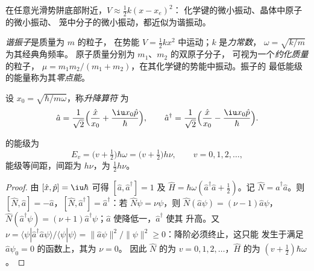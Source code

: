 在任意光滑势阱底部附近，$V \approx \frac12 k(x - x_e)^2$：
化学键的微小振动、晶体中原子的微小振动、
笼中分子的微小振动，都近似为谐振动。

\begin{definition}\label{def:b3:quantum-model-systems:oscillator}
\emph{谐振子}是质量为 $m$ 的粒子，
在势能 $V = \frac12 kx^2$ 中运动；$k$ 是\emph{力常数}，
$\omega = \sqrt{k/m}$ 为其经典角频率。
原子质量分别为 $m_1$、$m_2$ 的双原子分子，
可视为一个\emph{约化质量}的粒子，
$\mu = m_1m_2/(m_1 + m_2)$，在其化学键的势能中振动。振子的
最低能级的能量称为其\emph{零点能}。
\end{definition}

\begin{definition}[升降算符]\label{def:b3:quantum-model-systems:ladder}
设 $x_0 = \sqrt{\hbar/m\omega}$，称\emph{升降算符}
为
\[
\hat a = \frac{1}{\sqrt2}\Big(\frac{\hat x}{x_0} + \frac{\iu x_0\hat p}{\hbar}\Big),
\qquad \hat a^\dagger = \frac{1}{\sqrt2}\Big(\frac{\hat x}{x_0} -
\frac{\iu x_0\hat p}{\hbar}\Big).
\]
\end{definition}

\begin{theorem}[谐振子的能级]\label{thm:b3:quantum-model-systems:oscillator}
的能级为
\[
E_v = \big(v + \tfrac12\big)\hbar\omega = \big(v + \tfrac12\big)h\nu, \qquad v =
0, 1, 2, \dots,
\]
能级等间距，间距为 $h\nu$，为 $\frac12h\nu$。
\end{theorem}

\begin{proof}
由 $[\hat x,\hat p] = \iu\hbar$ 可得 $[\hat a,\hat a^\dagger] = 1$ 及
$\hat H = \hbar\omega(\hat a^\dagger\hat a + \frac12)$。记 $\hat N =
\hat a^\dagger\hat a$。则 $[\hat N,\hat a] = -\hat a$，$[\hat N,\hat
a^\dagger] = \hat a^\dagger$：若 $\hat N\psi = \nu\psi$，则 $\hat N(\hat
a\psi) = (\nu - 1)\hat a\psi$，$\hat N(\hat a^\dagger\psi) = (\nu + 1)\hat
a^\dagger\psi$；$\hat a$ 使降低一，$\hat a^\dagger$ 使其
升高。又 $\nu = \langle\psi|\hat a^\dagger\hat a\psi\rangle/\langle\psi|\psi
\rangle = \|\hat a\psi\|^2/\|\psi\|^2 \ge 0$：降阶必须终止，这只能
发生于满足 $\hat a\psi_0 = 0$ 的函数上，其为 $\nu = 0$。
因此 $\hat N$ 的为 $v = 0, 1, 2, \dots$，$\hat H$ 的为
$(v + \frac12)\hbar\omega$。
\end{proof}

